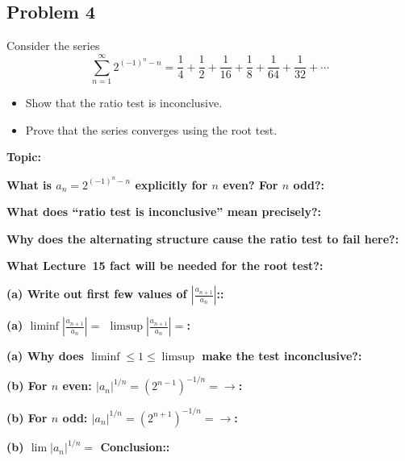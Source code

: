 \documentclass[12pt]{article}
\newcommand{\fillfield}[1]{%
  \par\noindent\textbf{#1:}\enspace\hrulefill\par\vspace{3pt}%
}
\begin{document}
\subsection{Problem 4}

\begin{tcolorbox}[
  enhanced, breakable,
  colback  = probblue,
  colframe = blue!55!black,
  fonttitle = \bfseries,
  title = {\textsc{Problem Statement}\hfill Homework 7, Problem 4}
]
Consider the series
\[
  \sum_{n=1}^{\infty} 2^{(-1)^n - n}
  = \frac{1}{4} + \frac{1}{2} + \frac{1}{16} + \frac{1}{8} + \frac{1}{64} + \frac{1}{32} + \cdots
\]
\begin{itemize}[nosep, leftmargin=1.8em]
  \item[(a)] Show that the ratio test is inconclusive.
  \item[(b)] Prove that the series converges using the root test.
\end{itemize}
\end{tcolorbox}

\bigskip

\begin{tcolorbox}[
  enhanced, breakable,
  colback  = pass1green,
  colframe = green!55!black,
  fonttitle = \bfseries,
  title = {Pass 1 \enspace\textbf{--}\enspace First Diagnosis}
]
\fillfield{Topic}
\fillfield{What is $a_n = 2^{(-1)^n - n}$ explicitly for $n$ even? For $n$ odd?}
\fillfield{What does ``ratio test is inconclusive'' mean precisely?}
\fillfield{Why does the alternating structure cause the ratio test to fail here?}
\fillfield{What Lecture~15 fact will be needed for the root test?}
\end{tcolorbox}

\bigskip

\begin{tcolorbox}[
  enhanced, breakable,
  colback  = pass2yellow,
  colframe = yellow!65!black,
  fonttitle = \bfseries,
  title = {Pass 2 \enspace\textbf{--}\enspace Proof Recipe Card}
]
\fillfield{(a) Write out first few values of $\left|\frac{a_{n+1}}{a_n}\right|$:}
\fillfield{(a) $\liminf\left|\frac{a_{n+1}}{a_n}\right|=$\hspace{1cm} $\limsup\left|\frac{a_{n+1}}{a_n}\right|=$}
\fillfield{(a) Why does $\liminf \leq 1 \leq \limsup$ make the test inconclusive?}
\fillfield{(b) For $n$ even: $|a_n|^{1/n} = (2^{n-1})^{-1/n} = $\hrulefill $\to$}
\fillfield{(b) For $n$ odd: $|a_n|^{1/n} = (2^{n+1})^{-1/n} = $\hrulefill $\to$}
\fillfield{(b) $\lim|a_n|^{1/n}=$\hspace{1cm} Conclusion:}
\end{tcolorbox}
\end{document}
